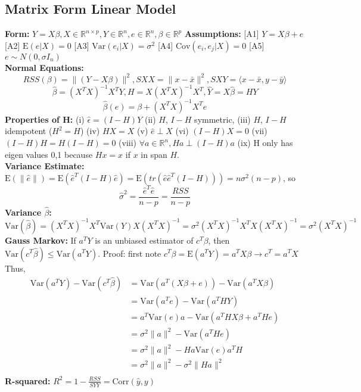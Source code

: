 \documentclass[10pt]{article}
\newcommand{\R}{\mathbb{R}}
\newcommand{\E}{\mathrm{E}}
\newcommand{\var}{\mathrm{Var}}
\newcommand{\cov}{\mathrm{Cov}}
\newcommand{\corr}{\mathrm{Corr}}
\theoremstyle{definition}
\begin{document}
\begin{multicols}{2}
\subsection{Matrix Form Linear Model} 
{\bf Form:} \(Y=X\beta, X\in \R^{n\times p}, Y \in \R^{n}, e \in \R^{n}, \beta \in \R^{p} \)
{\bf Assumptions:} [A1] \(Y=X\beta + e\) [A2] \(\E(e\vert X)=0\) [A3] \(\var(e_i\vert X) = \sigma^2\) [A4] \(\cov(e_i,e_j \vert X) =0\) [A5] \(e\sim N(0,\sigma I_n)\) \\
{\bf Normal Equations:} 
\[RSS(\beta) = \|(Y-X\beta)\|^2, SXX=\|x-\bar x\|^2, SXY = \langle x-\bar x, y-\bar y \rangle \]
\[\hat\beta = (X^TX)^{-1}X^TY, H=X(X^TX)^{-1}X^T, \hat Y = X\hat\beta = H Y\]
\[\hat\beta(e) = \beta + (X^TX)^{-1}X^Te \]
{\bf Properties of H:} (i) \(\hat\epsilon = (I-H)Y\) (ii) $H$, $I-H$ symmetric, (iii) $H$, $I-H$ idempotent ($H^2=H$) (iv) $HX=X$ (v) \(\hat e \perp X\) (vi) $(I-H)X=0$ (vii) $(I-H)H=H(I-H)=0$ (viii) \(\forall a\in \R^n, Ha\perp (I-H)a\) (ix) H only has eigen values 0,1 because $Hx=x$ if $x$ in span $H$. \\
{\bf Variance Estimate:} \(\E(\|\hat e\|) = \E(\hat e^T(I-H)\hat e) = \E(tr(\hat e \hat e^T (I-H))) = n\sigma^2(n-p)\), so
\[\hat\sigma^2 = \frac{\hat e^T\hat e}{n-p} = \frac{RSS}{n-p} \]
{\bf Variance $\hat\beta$:}
\(\var(\hat\beta) = (X^TX)^{-1}X^T\var(Y)X(X^TX)^{-1} = \sigma^2(X^TX)^{-1}X^TX(X^TX)^{-1} = \sigma^2 (X^TX)^{-1} \) \\
{\bf Gauss Markov:} If $a^TY$ is an unbiased estimator of $c^T\beta$, then \(\var(c^T\hat\beta)\leq\var(a^TY)\). Proof: first note \(c^T\beta=\E(a^TY)=a^TX\beta \rightarrow c^T=a^TX\) Thus,
\begin{align*}
    \var(a^TY) - \var(c^T\hat\beta) &= \var(a^T(X\beta+e)) - \var(a^TX\beta) \\
                                    &= \var(a^Te) - \var(a^THY) \\
                                    &= a^T\var(e)a - \var(a^THX\beta + a^THe) \\
                                    &= \sigma^2\|a\|^2 - \var(a^THe) \\
                                    &= \sigma^2\|a\|^2 - Ha\var(e)a^TH \\
                                    &= \sigma^2\|a\|^2 - \sigma^2\|Ha\|^2 \\
\end{align*}
{\bf R-squared:} \(R^2 = 1-\frac{RSS}{SYY} = \corr(\hat y,y) \)


\end{multicols}
\end{document}

